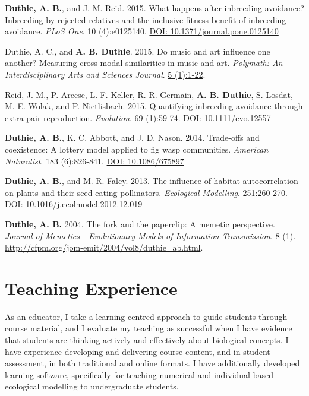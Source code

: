 \documentclass[letterpaper]{article}
\begin{document}
\begin{etaremune}
\item {\bf Duthie, A. B.}, and J. M. Reid. 2015. What happens after inbreeding avoidance? Inbreeding by rejected relatives and the inclusive fitness benefit of inbreeding avoidance. {\it PLoS One}. 10 (4):e0125140. \href{http://journals.plos.org/plosone/article?id=10.1371/journal.pone.0125140}{DOI: 10.1371/journal.pone.0125140}
\item Duthie, A. C., and {\bf A. B. Duthie}. 2015. Do music and art influence one another? Measuring cross-modal similarities in music and art. {\it Polymath: An Interdisciplinary Arts and Sciences Journal}. \href{https://ojcs.siue.edu/ojs/index.php/polymath/article/view/3013}{5 (1):1-22}.
\item Reid, J. M., P. Arcese, L. F. Keller, R. R. Germain, {\bf A. B. Duthie}, S. Losdat, M. E. Wolak, and P. Nietlisbach. 2015. Quantifying inbreeding avoidance through extra-pair reproduction. {\it Evolution}. 69 (1):59-74. \href{http://onlinelibrary.wiley.com/doi/10.1111/evo.12557/abstract}{DOI: 10.1111/evo.12557}
\item {\bf Duthie, A. B.}, K. C. Abbott, and J. D. Nason. 2014. Trade-offs and coexistence: A lottery model applied to fig wasp communities. {\it American Naturalist}. 183 (6):826-841. \href{http://www.jstor.org/stable/10.1086/675897}{DOI: 10.1086/675897}
\item {\bf Duthie, A. B.}, and M. R. Falcy. 2013. The influence of habitat autocorrelation on plants and their seed-eating pollinators. {\it Ecological Modelling}. 251:260-270. \href{http://www.sciencedirect.com/science/article/pii/S0304380013000021}{DOI: 10.1016/j.ecolmodel.2012.12.019}
\item {\bf Duthie, A. B.} 2004. The fork and the paperclip: A memetic perspective. {\it Journal of Memetics - Evolutionary Models of Information Transmission}. 8 (1). \href{http://cfpm.org/jom-emit/2004/vol8/duthie_ab.html}{http://cfpm.org/jom-emit/2004/vol8/duthie\_ab.html}.
\end{etaremune}



\section*{Teaching Experience}
\hrulefill


As an educator, I take a learning-centred approach to guide students through course material, and I evaluate my teaching as successful when I have evidence that students are thinking actively and effectively about biological concepts. I have experience developing and delivering course content, and in student assessment, in both traditional and online formats. I have additionally developed \href{https://bradduthie.shinyapps.io/EcoEdu/}{learning software}, specifically for teaching numerical and individual-based ecological modelling to undergraduate students.
\end{document}
